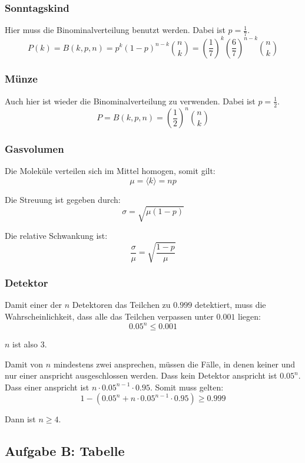 \documentclass[11pt]{article}
\newcommand{\half}{\frac{1}{2}}
\begin{document}
\subsubsection{Sonntagskind}

Hier muss die Binominalverteilung benutzt werden. Dabei ist $p = \frac 17$.
\[ P(k) = B(k, p, n) = p^k(1-p)^{n-k} \binom nk = \left( \frac 17 \right)^k \left( \frac 67 \right)^{n-k} \binom nk \]

\subsubsection{Münze}

Auch hier ist wieder die Binominalverteilung zu verwenden. Dabei ist $p = \half$.
\[ P = B(k, p, n) = \left(\half\right)^n \binom nk \]

\subsubsection{Gasvolumen}

Die Moleküle verteilen sich im Mittel homogen, somit gilt:
\[ \mu = \langle k \rangle = np \]

Die Streuung ist gegeben durch:
\[ \sigma = \sqrt{\mu (1-p)} \]

Die relative Schwankung ist:
\[ \frac \sigma \mu = \sqrt{\frac{1-p}\mu} \]

\subsubsection{Detektor}

Damit einer der $n$ Detektoren das Teilchen zu $0.999$ detektiert, muss die Wahrscheinlichkeit, dass alle das Teilchen verpassen unter $0.001$ liegen:
\[ 0.05^n \leq 0.001 \]

$n$ ist also $3$.

Damit von $n$ mindestens zwei ansprechen, müssen die Fälle, in denen keiner und nur einer anspricht ausgeschlossen werden. Dass kein Detektor anspricht ist $0.05^n$. Dass einer anspricht ist $n \cdot 0.05^{n-1} \cdot 0.95$. Somit muss gelten:
\[ 1 - \left( 0.05^n + n \cdot 0.05^{n-1} \cdot 0.95 \right) \geq 0.999 \]

Dann ist $n \geq 4$.

\subsection{Aufgabe B: Tabelle}
\end{document}
